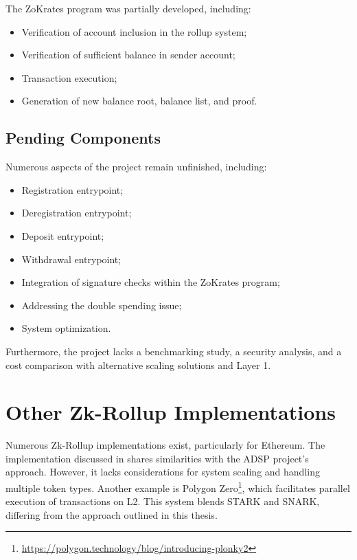 The ZoKrates program was partially developed, including:
\begin{itemize}
    \item Verification of account inclusion in the rollup system;
    \item Verification of sufficient balance in sender account;
    \item Transaction execution;
    \item Generation of new balance root, balance list, and proof.
\end{itemize}

\subsection{Pending Components}
Numerous aspects of the project remain unfinished, including:
\begin{itemize}
  \item Registration entrypoint;
  \item Deregistration entrypoint;
  \item Deposit entrypoint;
  \item Withdrawal entrypoint;
  \item Integration of signature checks within the ZoKrates program;
  \item Addressing the double spending issue;
  \item System optimization.
\end{itemize}
Furthermore, the project lacks a benchmarking study, a security analysis, and a cost comparison with alternative scaling solutions and Layer 1.


\section{Other Zk-Rollup Implementations}
Numerous Zk-Rollup implementations exist, particularly for Ethereum. The implementation discussed in \cite{dinh_implementation_2023} shares similarities with the ADSP project's approach. However, it lacks considerations for system scaling and handling multiple token types. Another example is Polygon Zero\footnote{\url{https://polygon.technology/blog/introducing-plonky2}}, which facilitates parallel execution of transactions on L2. This system blends STARK and SNARK, differing from the approach outlined in this thesis.

